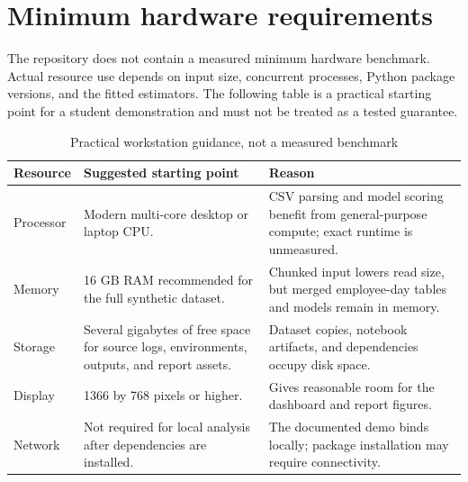 \section{Minimum hardware requirements}
\label{app:hardware}
The repository does not contain a measured minimum hardware
benchmark. Actual resource use depends on input size, concurrent
processes, Python package versions, and the fitted estimators. The
following table is a practical starting point for a student
demonstration and must not be treated as a tested guarantee.

\begin{table}[H]
\centering
\tablefont
\caption{Practical workstation guidance, not a measured benchmark}
\label{tab:hardware-requirements}
\begin{tabularx}{\textwidth}{|p{}|p{}|Y|}
\hline
\textbf{Resource} & \textbf{Suggested starting point} & \textbf{Reason}\\\hline
Processor & Modern multi-core desktop or laptop CPU. & CSV parsing and model scoring benefit from general-purpose compute; exact runtime is unmeasured.\\\hline
Memory & 16 GB RAM recommended for the full synthetic dataset. & Chunked input lowers read size, but merged employee-day tables and models remain in memory.\\\hline
Storage & Several gigabytes of free space for source logs, environments, outputs, and report assets. & Dataset copies, notebook artifacts, and dependencies occupy disk space.\\\hline
Display & 1366 by 768 pixels or higher. & Gives reasonable room for the dashboard and report figures.\\\hline
Network & Not required for local analysis after dependencies are installed. & The documented demo binds locally; package installation may require connectivity.\\\hline
\end{tabularx}
\end{table}

